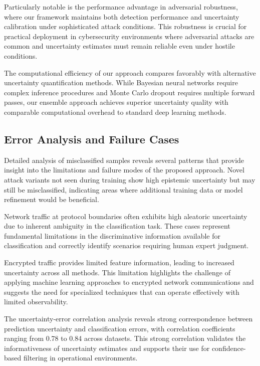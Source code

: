 \documentclass[journal]{IEEEtran}
\begin{document}
Particularly notable is the performance advantage in adversarial robustness, where our framework maintains both detection performance and uncertainty calibration under sophisticated attack conditions. This robustness is crucial for practical deployment in cybersecurity environments where adversarial attacks are common and uncertainty estimates must remain reliable even under hostile conditions.

The computational efficiency of our approach compares favorably with alternative uncertainty quantification methods. While Bayesian neural networks require complex inference procedures and Monte Carlo dropout requires multiple forward passes, our ensemble approach achieves superior uncertainty quality with comparable computational overhead to standard deep learning methods.

\subsection{Error Analysis and Failure Cases}

Detailed analysis of misclassified samples reveals several patterns that provide insight into the limitations and failure modes of the proposed approach. Novel attack variants not seen during training show high epistemic uncertainty but may still be misclassified, indicating areas where additional training data or model refinement would be beneficial.

Network traffic at protocol boundaries often exhibits high aleatoric uncertainty due to inherent ambiguity in the classification task. These cases represent fundamental limitations in the discriminative information available for classification and correctly identify scenarios requiring human expert judgment.

Encrypted traffic provides limited feature information, leading to increased uncertainty across all methods. This limitation highlights the challenge of applying machine learning approaches to encrypted network communications and suggests the need for specialized techniques that can operate effectively with limited observability.

The uncertainty-error correlation analysis reveals strong correspondence between prediction uncertainty and classification errors, with correlation coefficients ranging from 0.78 to 0.84 across datasets. This strong correlation validates the informativeness of uncertainty estimates and supports their use for confidence-based filtering in operational environments.
\end{document}
